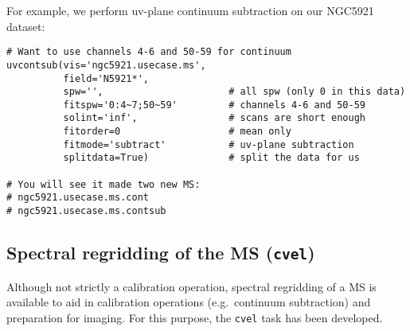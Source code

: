 For example, we perform uv-plane continuum subtraction on our
NGC5921 dataset:
\small
\begin{verbatim}
# Want to use channels 4-6 and 50-59 for continuum
uvcontsub(vis='ngc5921.usecase.ms',
          field='N5921*',
          spw='',                      # all spw (only 0 in this data)
          fitspw='0:4~7;50~59'         # channels 4-6 and 50-59
          solint='inf',                # scans are short enough
          fitorder=0                   # mean only
          fitmode='subtract'           # uv-plane subtraction
          splitdata=True)              # split the data for us

# You will see it made two new MS:
# ngc5921.usecase.ms.cont
# ngc5921.usecase.ms.contsub
\end{verbatim}
\normalsize

\subsection{Spectral regridding of the MS ({\tt cvel})}
\label{section:cal.other.cvel}

Although not strictly a calibration operation, spectral regridding
of a MS is available to aid in calibration operations (e.g.\ continuum
subtraction) and preparation for imaging.  For this purpose, the
{\tt cvel} task has been developed.  

